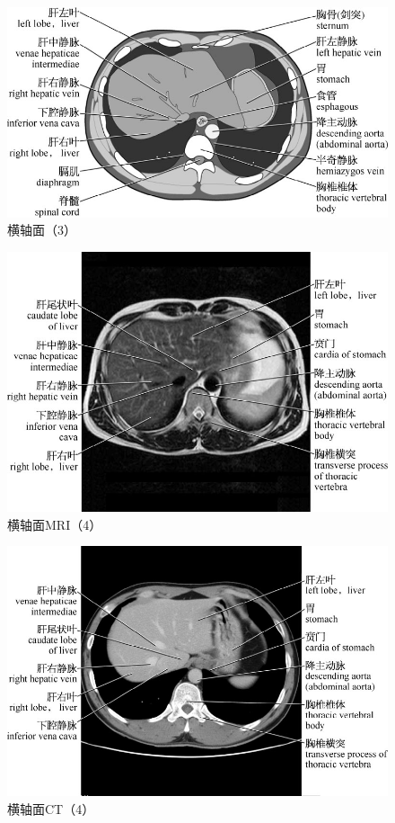 \begin{figure}[!htbp]
 \centering
 \includegraphics{./images/Image00010.jpg}
 \captionsetup{justification=centering}
 \caption{横轴面（3）}
  \end{figure} 
 \FloatBarrier

\begin{figure}[!htbp]
 \centering
 \includegraphics{./images/Image00011.jpg}
 \captionsetup{justification=centering}
 \caption{横轴面MRI（4）}
  \end{figure} 
 \FloatBarrier

\begin{figure}[!htbp]
 \centering
 \includegraphics{./images/Image00012.jpg}
 \captionsetup{justification=centering}
 \caption{横轴面CT（4）}
  \end{figure} 
 \FloatBarrier

